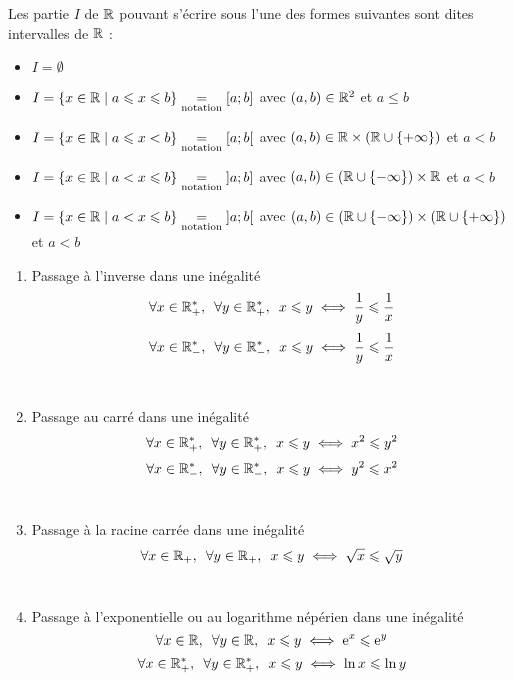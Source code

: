 \begin{nota}[Intervalles de \(\R\)]
	Les partie \(I\) de \(\R\) pouvant s’écrire sous l’une des formes suivantes sont dites intervalles de \(\R\) :
	\begin{itemize}
		\item \(I = \emptyset\) \\
		\item \(I = \left\lbrace x \in \mathbb{R}\;\middle|\; a \leqslant x \leqslant b\right\rbrace \underset{\mathrm{notation}}{=} \left[a;b\right]\) avec \(\left(a,b\right) \in \mathbb{R}^2 \) et \(a\leq b \) \\
		\item \(I = \left\lbrace x \in \mathbb{R}\;\middle|\; a \leqslant x < b\right\rbrace \underset{\mathrm{notation}}{=} \left[a;b\right[\) avec \(\left(a,b\right) \in \mathbb{R}\times \left(\mathbb{R} \cup \left\lbrace+\infty\right\rbrace\right) \) et \(a < b\) \\
		\item \(I = \left\lbrace x \in \mathbb{R}\;\middle|\; a < x \leqslant b\right\rbrace \underset{\mathrm{notation}}{=} \left]a;b\right]\) avec \(\left(a,b\right) \in \left(\mathbb{R} \cup \left\lbrace-\infty\right\rbrace\right)\times \mathbb{R} \) et \(a < b\) \\
		\item \(I = \left\lbrace x \in \mathbb{R}\;\middle|\; a < x \leqslant b\right\rbrace \underset{\mathrm{notation}}{=} \left]a;b\right[\) avec \(\left(a,b\right) \in \left(\mathbb{R} \cup \left\lbrace-\infty\right\rbrace\right)\times  \left(\mathbb{R} \cup \left\lbrace+\infty\right\rbrace\right) \) et \(a < b\) \\

	\end{itemize}
\end{nota}

\begin{prop}
	\begin{enumerate}
		\item Passage à l'inverse dans une inégalité
		      \[\quantifs{\forall x \in \Rps ; \forall y \in \Rps} x\leq y \iff \frac{1}{y} \leq \frac{1}{x}\]
		      \[\quantifs{\forall x \in \Rms ; \forall y \in \Rms} x\leq y \iff \frac{1}{y} \leq \frac{1}{x}\] \\
		\item Passage au carré dans une inégalité
		      \[\quantifs{\forall x \in \Rps ; \forall y \in \Rps} x\leq y \iff x^2 \leq y^2\]
		      \[\quantifs{\forall x \in \Rms ; \forall y \in \Rms} x\leq y \iff y^2 \leq x^2\] \\
		\item Passage à la racine carrée dans une inégalité
		      \[\quantifs{\forall x \in \Rp ; \forall y \in \Rp} x\leq y \iff \sqrt{x}\leq \sqrt{y}\] \\
		\item Passage à l’exponentielle ou au logarithme népérien dans une inégalité
		      \[\quantifs{\forall x \in \R ; \forall y \in \R} x\leq y \iff \e{x}\leq \e{y}\]
		      \[\quantifs{\forall x \in \Rps ; \forall y \in \Rps} x\leq y \iff \ln{x}\leq \ln{y}\] \\
	\end{enumerate}
\end{prop}


